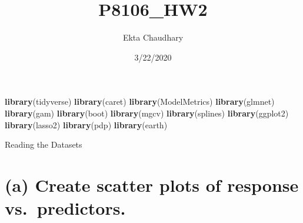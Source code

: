 \documentclass[]{article}
\title{P8106\_HW2}
\author{Ekta Chaudhary}
\date{3/22/2020}
\newenvironment{Shaded}{\begin{snugshade}}{\end{snugshade}}
\newcommand{\DecValTok}[1]{\textcolor[rgb]{0.00,0.00,0.81}{#1}}
\newcommand{\KeywordTok}[1]{\textcolor[rgb]{0.13,0.29,0.53}{\textbf{#1}}}
\newcommand{\NormalTok}[1]{#1}
\newcommand{\OperatorTok}[1]{\textcolor[rgb]{0.81,0.36,0.00}{\textbf{#1}}}
\newcommand{\StringTok}[1]{\textcolor[rgb]{0.31,0.60,0.02}{#1}}
\begin{document}
\maketitle

\begin{Shaded}
\begin{Highlighting}[]
\KeywordTok{library}\NormalTok{(tidyverse)}
\KeywordTok{library}\NormalTok{(caret)}
\KeywordTok{library}\NormalTok{(ModelMetrics)}
\KeywordTok{library}\NormalTok{(glmnet)}
\KeywordTok{library}\NormalTok{(gam)}
\KeywordTok{library}\NormalTok{(boot)}
\KeywordTok{library}\NormalTok{(mgcv)}
\KeywordTok{library}\NormalTok{(splines)}
\KeywordTok{library}\NormalTok{(ggplot2)}
\KeywordTok{library}\NormalTok{(lasso2)}
\KeywordTok{library}\NormalTok{(pdp)}
\KeywordTok{library}\NormalTok{(earth)}
\end{Highlighting}
\end{Shaded}

Reading the Datasets

\begin{Shaded}
\end{Shaded}

\begin{Shaded}
\end{Shaded}

\hypertarget{a-create-scatter-plots-of-response-vs.predictors.}{%
\section{(a) Create scatter plots of response
vs.~predictors.}\label{a-create-scatter-plots-of-response-vs.predictors.}}
\end{document}
